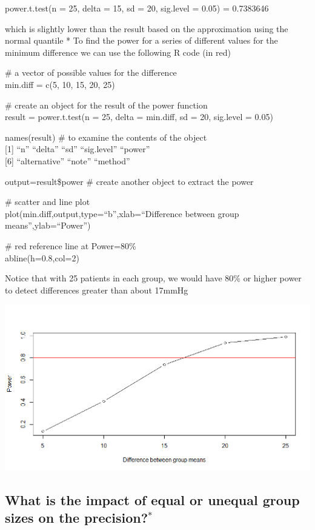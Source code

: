 \documentclass[
]{book}
\begin{document}
power.t.test(n = 25, delta = 15, sd = 20, sig.level = 0.05)
= 0.7383646

which is slightly lower than the result based on the approximation using the normal quantile
* To find the power for a series of different values for the minimum difference we can use the following R code ({in red})

\(\#\) a vector of possible values for the difference\\
{min.diff = c(5, 10, 15, 20, 25)}

\(\#\) create an object for the result of the power function\\
{result = power.t.test(n = 25, delta = min.diff, sd = 20, sig.level = 0.05)}

{names(result)} \# to examine the contents of the object\\
{[}1{]} ``n'' ``delta'' ``sd'' ``sig.level'' ``power''\\
{[}6{]} ``alternative'' ``note'' ``method''

{output=result\$power} \# create another object to extract the power

\(\#\) scatter and line plot\\
{plot(min.diff,output,type=``b'',xlab=``Difference between group means'',ylab=``Power'')}

\(\#\) red reference line at Power=80\%\\
{abline(h=0.8,col=2)}

Notice that with 25 patients in each group, we would have 80\% or higher power to detect differences greater than about 17mmHg

\includegraphics[width=0.7\linewidth]{./4_73}

\hypertarget{what-is-the-impact-of-equal-or-unequal-group-sizes-on-the-precision-1}{%
\subsection{\texorpdfstring{What is the impact of equal or unequal group sizes on the precision?\(^*\)}{What is the impact of equal or unequal group sizes on the precision?\^{}*}}\label{what-is-the-impact-of-equal-or-unequal-group-sizes-on-the-precision-1}}
\end{document}
